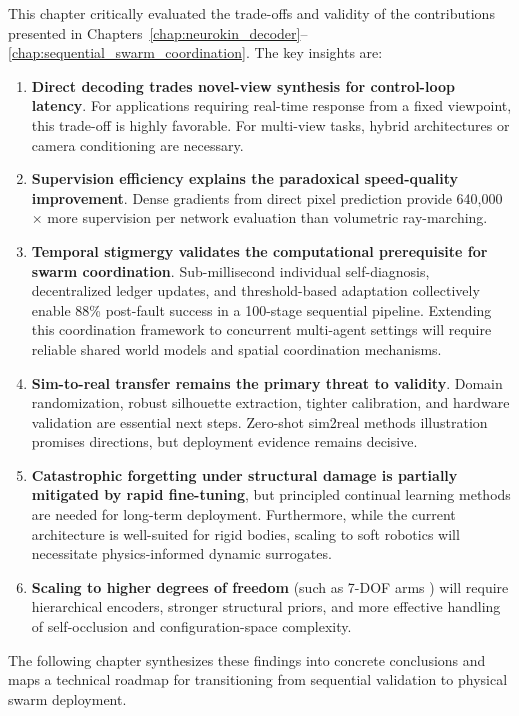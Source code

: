 \documentclass[12pt,a4paper,oneside]{report}
\begin{document}
This chapter critically evaluated the trade-offs and validity of the contributions presented in Chapters~\ref{chap:neurokin_decoder}--\ref{chap:sequential_swarm_coordination}. The key insights are:
\begin{enumerate}
    \item \textbf{Direct decoding trades novel-view synthesis for control-loop latency}. For applications requiring real-time response from a fixed viewpoint, this trade-off is highly favorable. For multi-view tasks, hybrid architectures or camera conditioning are necessary.
    \item \textbf{Supervision efficiency explains the paradoxical speed-quality improvement}. Dense gradients from direct pixel prediction provide 640,000$\times$ more supervision per network evaluation than volumetric ray-marching.
    \item \textbf{Temporal stigmergy validates the computational prerequisite for swarm coordination}. Sub-millisecond individual self-diagnosis, decentralized ledger updates, and threshold-based adaptation collectively enable 88\% post-fault success in a 100-stage sequential pipeline. Extending this coordination framework to concurrent multi-agent settings will require reliable shared world models and spatial coordination mechanisms.
    \item \textbf{Sim-to-real transfer remains the primary threat to validity}. Domain randomization, robust silhouette extraction, tighter calibration, and hardware validation are essential next steps. Zero-shot sim2real methods illustration promises directions, but deployment evidence remains decisive.
    \item \textbf{Catastrophic forgetting under structural damage is partially mitigated by rapid fine-tuning}, but principled continual learning methods are needed for long-term deployment. Furthermore, while the current architecture is well-suited for rigid bodies, scaling to soft robotics will necessitate physics-informed dynamic surrogates.
    \item \textbf{Scaling to higher degrees of freedom} (such as 7-DOF arms \cite{schulze2024high}) will require hierarchical encoders, stronger structural priors, and more effective handling of self-occlusion and configuration-space complexity.
\end{enumerate}
The following chapter synthesizes these findings into concrete conclusions and maps a technical roadmap for transitioning from sequential validation to physical swarm deployment.
\end{document}
